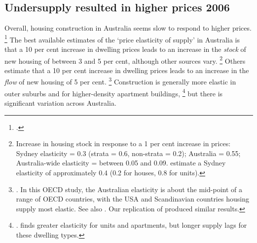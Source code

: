 
\subsection{Undersupply resulted in higher prices 2006}\label{subsec:undersupply-led-to-higher-prices}

Overall, housing construction in Australia seems slow to respond to higher prices.%
    \footcites{Treasury2013Housing}[][90]{IMF2018_ArticleIV}{OngEtAl-AHURI-2017-Housing-supply-responsiveness}
The best available estimates of the `price elasticity of supply' in Australia is that a 10 per cent increase in dwelling prices leads to an increase in the \emph{stock} of new housing of between 3 and 5 per cent, although other sources vary.%
    \footnote{Increase in housing stock in response to a 1 per cent increase in prices: \textcite{GitelmanOtto2012} Sydney elasticity = 0.3 (strata = 0.6, non-strata = 0.2); \textcite{Ball-etal-2010-Housing-supply-elasticities} Australia = 0.55; \textcite{OngEtAl-AHURI-2017-Housing-supply-responsiveness}
	Australia-wide elasticity = between 0.05 and 0.09. \textcite{Liu-Otto-2017-Housing-supply-elasticity-Syd-LGA} estimate a Sydney elasticity of approximately 0.4 (0.2 for houses, 0.8 for units).}
Others estimate that a 10 per cent increase in dwelling prices leads to an increase in the \emph{flow} of new housing of 5 per cent.%
    \footnote{\textcite{AndrewsEtAlHousing}.
	In this OECD study, the Australian elasticity is about the mid-point of a range of OECD countries, with the USA and Scandinavian countries housing supply most elastic. See also \textcite[][31]{IMF2018_ArticleIV}.
	Our replication of \textcite{AndrewsEtAlHousing} produced similar results.}
Construction is generally more elastic in outer suburbs and for higher-density apartment buildings,%
    \footnote{\textcites{GitelmanOtto2012}{Liu-Otto-2017-Housing-supply-elasticity-Syd-LGA}.
    \textcite{McLaughlinHousing2012} finds greater elasticity for units and apartments, but longer supply lags for these dwelling types.}
but there is significant variation across Australia.

